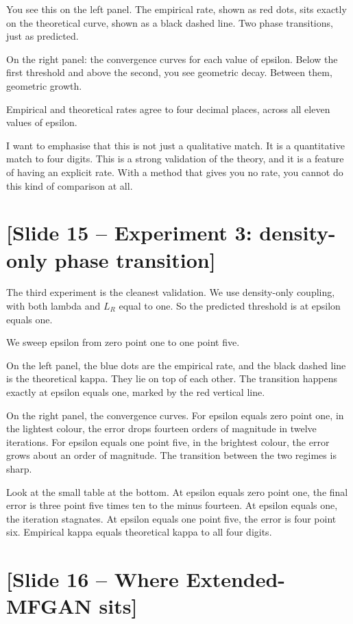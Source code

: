 \documentclass[11pt]{article}
\begin{document}
You see this on the left panel. The empirical rate, shown as red dots,
sits exactly on the theoretical curve, shown as a black dashed line. Two
phase transitions, just as predicted.

On the right panel: the convergence curves for each value of epsilon.
Below the first threshold and above the second, you see geometric decay.
Between them, geometric growth.

Empirical and theoretical rates agree to four decimal places, across all
eleven values of epsilon.

I want to emphasise that this is not just a qualitative match. It is a
quantitative match to four digits. This is a strong validation of the
theory, and it is a feature of having an explicit rate. With a method
that gives you no rate, you cannot do this kind of comparison at all.

\section*{[Slide 15 -- Experiment 3: density-only phase transition]}

The third experiment is the cleanest validation. We use density-only
coupling, with both lambda and $L_R$ equal to one. So the predicted
threshold is at epsilon equals one.

We sweep epsilon from zero point one to one point five.

On the left panel, the blue dots are the empirical rate, and the black
dashed line is the theoretical kappa. They lie on top of each other.
The transition happens exactly at epsilon equals one, marked by the red
vertical line.

On the right panel, the convergence curves. For epsilon equals zero point
one, in the lightest colour, the error drops fourteen orders of magnitude
in twelve iterations. For epsilon equals one point five, in the brightest
colour, the error grows about an order of magnitude. The transition between
the two regimes is sharp.

Look at the small table at the bottom. At epsilon equals zero point one,
the final error is three point five times ten to the minus fourteen.
At epsilon equals one, the iteration stagnates. At epsilon equals one
point five, the error is four point six. Empirical kappa equals
theoretical kappa to all four digits.

\section*{[Slide 16 -- Where Extended-MFGAN sits]}
\end{document}
